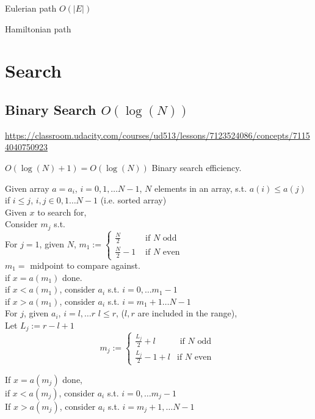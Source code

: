 \documentclass[10pt]{amsart}
\begin{document}
Eulerian path $O(|E|) $ 

Hamiltonian path



\section{Search}

\subsection{Binary Search $O(\log{(N)})$}

\url{https://classroom.udacity.com/courses/ud513/lessons/7123524086/concepts/71154040750923}

$O(\log{(N)} + 1) = O(\log{(N)})$ Binary search efficiency.

Given array $a=a_i$, $i=0,1,\dots N-1$, $N$ elements in an array, s.t. $a(i) \leq a(j)$ if $i\leq j$, $i,j \in 0, 1\dots N-1$ (i.e. sorted array) \\
Given $x$ to search for, \\
Consider $m_j$ s.t. \\
For $j=1$, given $N$, $m_1 := \begin{cases} \frac{N}{2} & \text{ if $N$ odd } \\
\frac{N}{2} -1 & \text{ if $N$ even } \end{cases} $ \\

$m_1=$ midpoint to compare against. \\

if $x=a(m_1)$ done. \\
if $x< a(m_1)$, consider $a_i$ s.t. $i=0, \dots m_1-1$ \\
if $x>a(m_1)$, consider $a_i$ s.t. $i=m_1+1 \dots N-1$ \\

For $j$, given $a_i$, $i=l, \dots r$ $l\leq r$, ($l, r$ are included in the range), \\
Let $L_j := r - l +1$ \\
\[
m_j := \begin{cases} \frac{L_j}{2} + l & \text{ if $N$ odd } \\
\frac{L_j}{2} - 1 + l & \text{if $N$ even } \end{cases} 
\]

If $x=a(m_j)$ done, \\
if $x<a(m_j)$, consider $a_i$ s.t. $i=0,\dots m_j -1$ \\
If $x> a(m_j)$, consider $a_i$ s.t. $i=m_j+1, \dots N-1$ 
\end{document}
